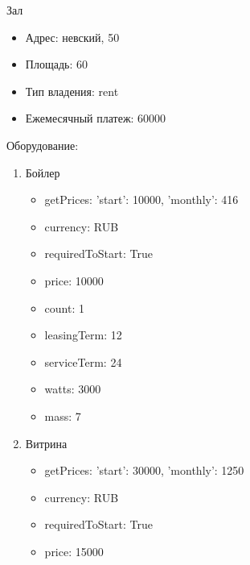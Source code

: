 \documentclass[a4paper,12pt]{article}
\begin{document}
  
    Зал

    \begin{itemize}
    \item Адрес: невский, 50
    \item Площадь: 60
    \item Тип владения: rent
    \item Ежемесячный платеж: 60000
    \end{itemize}
    
    Оборудование:
    \begin{enumerate}
      
      \item Бойлер
        \begin{itemize}
        
          \item getPrices: {'start': 10000, 'monthly': 416}
        
          \item currency: RUB
        
          \item requiredToStart: True
        
          \item price: 10000
        
          \item count: 1
        
          \item leasingTerm: 12
        
          \item serviceTerm: 24
        
          \item watts: 3000
        
          \item mass: 7
        
        \end{itemize}
      
      \item Витрина
        \begin{itemize}
        
          \item getPrices: {'start': 30000, 'monthly': 1250}
        
          \item currency: RUB
        
          \item requiredToStart: True
        
          \item price: 15000
        

\end{itemize}
\end{enumerate}
\end{document}
